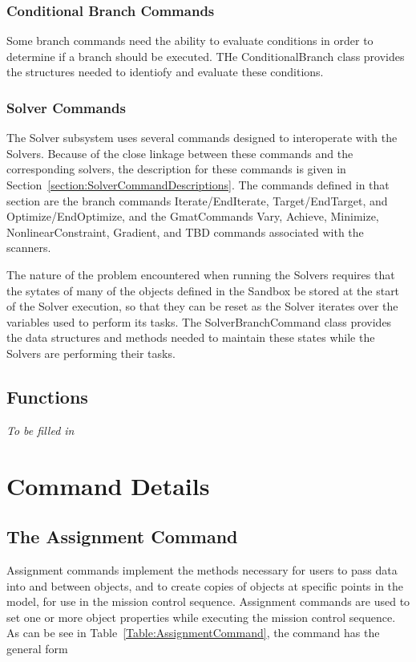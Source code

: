 \subsubsection{Conditional Branch Commands}

Some branch commands need the ability to evaluate conditions in order to determine if a branch
should be executed.  THe ConditionalBranch class provides the structures needed to identiofy and
evaluate these conditions.

\subsubsection{Solver Commands}

The Solver subsystem uses several commands designed to interoperate with the Solvers.  Because of
the close linkage between these commands and the corresponding solvers, the description for these
commands is given in Section~\ref{section:SolverCommandDescriptions}.  The commands defined in that
section are the branch commands Iterate/EndIterate, Target/EndTarget, and Optimize/EndOptimize, and
the GmatCommands Vary, Achieve, Minimize, NonlinearConstraint, Gradient, and TBD commands
associated with the scanners.

The nature of the problem encountered when running the Solvers requires that the sytates of many of
the objects defined in the Sandbox be stored at the start of the Solver execution, so that they can
be reset as the Solver iterates over the variables used to perform its tasks.  The
SolverBranchCommand class provides the data structures and methods needed to maintain these states
while the Solvers are performing their tasks.

\subsection{Functions}

\textit{To be filled in}

\section{Command Details}

\subsection{\label{section:Assignment}The Assignment Command}

Assignment commands implement the methods necessary for users to pass data into and between objects,
and to create copies of objects at specific points in the model, for use in the mission control
sequence.  Assignment commands are used to set one or more object properties while executing the
mission control sequence.  As can be see in Table~\ref{Table:AssignmentCommand}, the command has the
general form

